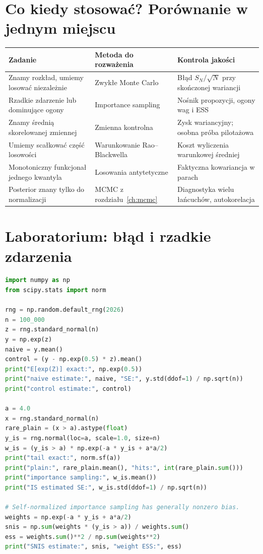 \documentclass[11pt,a4paper,oneside]{report}
\numberwithin{equation}{chapter}
\theoremstyle{plain}
\theoremstyle{definition}
\theoremstyle{remark}
\begin{document}
\section{Co kiedy stosować? Porównanie w jednym miejscu}
\begin{center}\small
\begin{tabular}{>{\raggedright\arraybackslash}p{}>{\raggedright\arraybackslash}p{}>{\raggedright\arraybackslash}p{}}
\toprule
\textbf{Zadanie} & \textbf{Metoda do rozważenia} & \textbf{Kontrola jakości}\\
\midrule
Znamy rozkład, umiemy losować niezależnie & Zwykłe Monte Carlo & Błąd $S_N/\sqrt N$ przy skończonej wariancji\\
Rzadkie zdarzenie lub dominujące ogony & Importance sampling & Nośnik propozycji, ogony wag i ESS\\
Znamy średnią skorelowanej zmiennej & Zmienna kontrolna & Zysk wariancyjny; osobna próba pilotażowa\\
Umiemy scałkować część losowości & Warunkowanie Rao--Blackwella & Koszt wyliczenia warunkowej średniej\\
Monotoniczny funkcjonał jednego kwantyla & Losowania antytetyczne & Faktyczna kowariancja w parach\\
Posterior znany tylko do normalizacji & MCMC z rozdziału~\ref{ch:mcmc} & Diagnostyka wielu łańcuchów, autokorelacja\\
\bottomrule
\end{tabular}
\end{center}

\section{Laboratorium: błąd i rzadkie zdarzenia}
\begin{lstlisting}[language=Python,caption={Kompletny program: Monte Carlo, zmienna kontrolna i importance sampling dla ogona normalnego (Python, NumPy i SciPy).}]
import numpy as np
from scipy.stats import norm

rng = np.random.default_rng(2026)
n = 100_000
z = rng.standard_normal(n)
y = np.exp(z)
naive = y.mean()
control = (y - np.exp(0.5) * z).mean()
print("E[exp(Z)] exact:", np.exp(0.5))
print("naive estimate:", naive, "SE:", y.std(ddof=1) / np.sqrt(n))
print("control estimate:", control)

a = 4.0
x = rng.standard_normal(n)
rare_plain = (x > a).astype(float)
y_is = rng.normal(loc=a, scale=1.0, size=n)
w_is = (y_is > a) * np.exp(-a * y_is + a*a/2)
print("tail exact:", norm.sf(a))
print("plain:", rare_plain.mean(), "hits:", int(rare_plain.sum()))
print("importance sampling:", w_is.mean())
print("IS estimated SE:", w_is.std(ddof=1) / np.sqrt(n))

# Self-normalized importance sampling has generally nonzero bias.
weights = np.exp(-a * y_is + a*a/2)
snis = np.sum(weights * (y_is > a)) / weights.sum()
ess = weights.sum()**2 / np.sum(weights**2)
print("SNIS estimate:", snis, "weight ESS:", ess)
\end{lstlisting}
\end{document}
